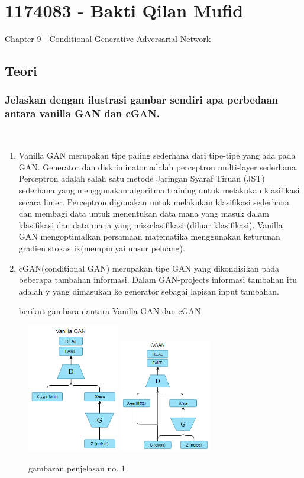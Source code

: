 \section{1174083 - Bakti Qilan Mufid}
Chapter 9 - Conditional Generative Adversarial Network
\subsection{Teori}
\subsubsection{Jelaskan dengan ilustrasi gambar sendiri apa perbedaan antara vanilla GAN dan cGAN.}
\hfill\\
\begin{enumerate}
\item Vanilla GAN merupakan tipe paling sederhana dari tipe-tipe yang ada pada GAN. Generator dan diskriminator adalah perceptron multi-layer sederhana. Perceptron adalah salah satu metode Jaringan Syaraf Tiruan (JST) sederhana yang menggunakan algoritma training untuk melakukan klasifikasi secara linier. Perceptron digunakan untuk melakukan klasifikasi sederhana dan membagi data untuk menentukan data mana yang masuk dalam klasifikasi dan data mana yang missclasifikasi (diluar klasifikasi). Vanilla GAN mengoptimalkan persamaan matematika menggunakan keturunan gradien stokastik(mempunyai unsur peluang).

\item cGAN(conditional GAN) merupakan tipe GAN yang dikondisikan pada beberapa tambahan informasi. Dalam GAN-projects informasi tambahan itu adalah y yang dimasukan ke generator sebagai lapisan input tambahan.

berikut gambaran antara Vanilla GAN dan cGAN 
\end{enumerate}
\begin{figure}[H]
	\centering
	\includegraphics[width=4cm]{figures/1174083/figures9/1.png}
	\includegraphics[width=4cm]{figures/1174083/figures9/1a.png}
	\caption{gambaran penjelasan no. 1}
\end{figure}

